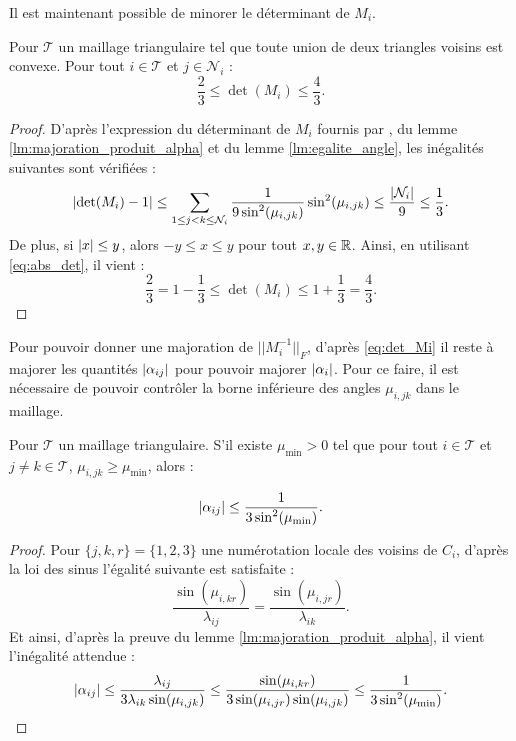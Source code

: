 \documentclass[12pt,a4paper]{article}
\begin{document}
	Il est maintenant possible de minorer le déterminant de $M_i$.
	
	\begin{lm}\label{lm:maj_det}
			Pour $\mathcal T$ un maillage triangulaire tel que toute union de deux triangles voisins est convexe. Pour tout $i \in\mathcal{T}$ et $j \in \mathcal N_i$ :
		\begin{equation}
			\frac23 \leq \det(M_i) \leq \dfrac43.
		\end{equation}
	\end{lm}
	\begin{proof}
		D'après l'expression du déterminant de $M_i$ fournis par \cite{florent}, du lemme \ref{lm:majoration_produit_alpha} et du lemme \ref{lm:egalite_angle}, les inégalités suivantes sont vérifiées :
		\begin{equation}\label{eq:abs_det}
			\left\lvert \det(M_i)-1 \right\rvert \leq \sum_{1\leq j < k \leq \mathcal N_i} \dfrac1{9\sin^2(\mu_{i,jk})}\sin^2(\mu_{i,jk}) \leq \frac{\left\lvert \mathcal N_i \right\rvert}{9} \leq \frac13.
		\end{equation}
		De plus, si $\left\lvert x \right\rvert \leq y$, alors $-y\leq x \leq y$ pour tout $x,y\in \mathbb{R}$. Ainsi, en utilisant \eqref{eq:abs_det}, il vient :
		\begin{equation}
			\frac23 = 1-\frac13 \leq \det(M_i) \leq 1+\frac13 = \frac43.
		\end{equation}
	\end{proof}
	
	Pour pouvoir donner une majoration de $|\!|M_i^{-1}|\!|_F$, d'après \eqref{eq:det_Mi} il reste à majorer les quantités $\left\lvert \alpha_{ij} \right\rvert$ pour pouvoir majorer $\left\lvert \alpha_i \right\rvert$. Pour ce faire, il est nécessaire de pouvoir contrôler la borne inférieure des angles $\mu_{i,jk}$ dans le maillage.
	
	\begin{lm}\label{lm:angle_min}
		Pour $\mathcal T$ un maillage triangulaire.	S'il existe $\mu_{\min} > 0$ tel que pour tout $i \in \mathcal T$ et $j \not = k \in \mathcal T$, $\mu_{i,jk} \geq \mu_{\min}$, alors :
			
			\[
				\left\lvert \alpha_{ij} \right\rvert \leq \dfrac1{3\sin^2(\mu_{\min})}.
			\]
	\end{lm}
	\begin{proof}
		Pour $\{j,k,r\} = \{1,2,3\}$ une numérotation locale des voisins de $C_i$, d'après la loi des sinus l'égalité suivante est satisfaite :
		\begin{equation}
			\frac{\sin(\mu_{i,kr})}{\lambda_{ij}} = \frac{\sin(\mu_{i,jr})}{\lambda_{ik}}.
		\end{equation}
		Et ainsi, d'après la preuve du lemme \ref{lm:majoration_produit_alpha}, il vient l'inégalité attendue : 
		\[
			\left\lvert \alpha_{ij} \right\rvert \leq \frac{\lambda_{ij}}{3\lambda_{ik}\sin(\mu_{i,jk})} \leq \frac{\sin(\mu_{i,kr})}{3\sin(\mu_{i,jr})\sin(\mu_{i,jk})} \leq \frac1{3\sin^2(\mu_{\min})}.
		\]
	\end{proof}
	
\end{document}
